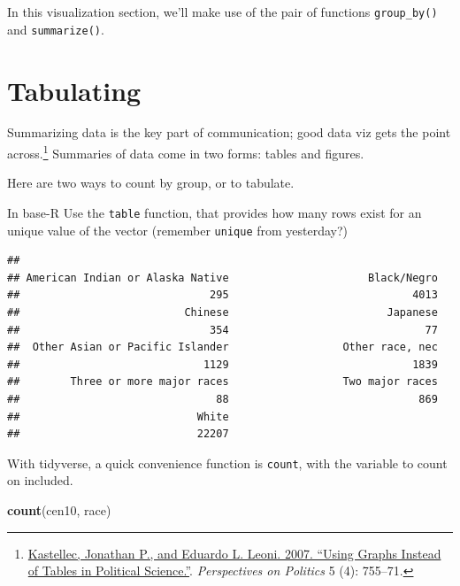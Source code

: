 \documentclass[]{book}
\newenvironment{Shaded}{\begin{snugshade}}{\end{snugshade}}
\newcommand{\KeywordTok}[1]{\textcolor[rgb]{0.13,0.29,0.53}{\textbf{#1}}}
\newcommand{\OperatorTok}[1]{\textcolor[rgb]{0.81,0.36,0.00}{\textbf{#1}}}
\newcommand{\NormalTok}[1]{#1}
\let\rmarkdownfootnote\footnote%
\def\footnote{\protect\rmarkdownfootnote}
\theoremstyle{definition}
\theoremstyle{definition}
\theoremstyle{definition}
\theoremstyle{remark}
\begin{document}
In this visualization section, we'll make use of the pair of functions
\texttt{group\_by()} and \texttt{summarize()}.

\section{Tabulating}\label{tabulating}

Summarizing data is the key part of communication; good data viz gets
the point across.\footnote{\href{http://www.princeton.edu/~jkastell/Tables2Graphs/graphs.pdf}{Kastellec,
  Jonathan P., and Eduardo L. Leoni. 2007. ``Using Graphs Instead of
  Tables in Political Science.''}. \emph{Perspectives on Politics} 5
  (4): 755--71.} Summaries of data come in two forms: tables and
figures.

Here are two ways to count by group, or to tabulate.

In base-R Use the \texttt{table} function, that provides how many rows
exist for an unique value of the vector (remember \texttt{unique} from
yesterday?)

\begin{Shaded}
\end{Shaded}

\begin{verbatim}
## 
## American Indian or Alaska Native                      Black/Negro 
##                              295                             4013 
##                          Chinese                         Japanese 
##                              354                               77 
##  Other Asian or Pacific Islander                  Other race, nec 
##                             1129                             1839 
##        Three or more major races                  Two major races 
##                               88                              869 
##                            White 
##                            22207
\end{verbatim}

With tidyverse, a quick convenience function is \texttt{count}, with the
variable to count on included.

\begin{Shaded}
\begin{Highlighting}[]
\KeywordTok{count}\NormalTok{(cen10, race)}
\end{Highlighting}
\end{Shaded}
\end{document}
